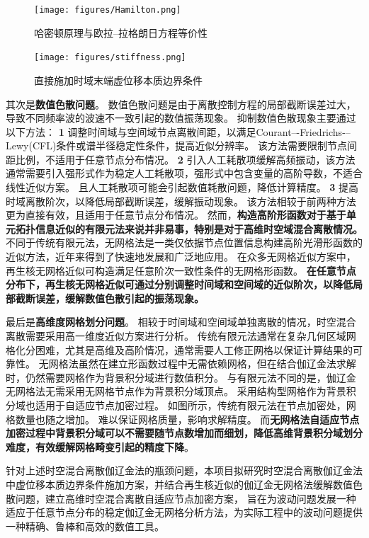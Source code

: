 \begin{figure}[!h]
    \centering 
    \texttt{[image: figures/Hamilton.png]}
    \caption{哈密顿原理与欧拉--拉格朗日方程等价性}
    \label{fg:hamilton}
\end{figure}

\begin{figure}[!h]
    \centering 
    \texttt{[image: figures/stiffness.png]}
    \caption{直接施加时域末端虚位移本质边界条件}
    \label{fg:direct}
\end{figure}

其次是\textbf{数值色散问题}。
数值色散问题是由于离散控制方程的局部截断误差过大，导致不同频率波的波速不一致引起的数值振荡现象。
抑制数值色散现象主要通过以下方法：
\textcircled{\textbf{\small 1}}
调整时间域与空间域节点离散间距，以满足Courant–-Friedrichs-–Lewy(CFL)条件或谱半径稳定性条件，提高近似分辨率。
该方法需要限制节点间距比例，不适用于任意节点分布情况。
\textcircled{\textbf{\small 2}}
引入人工耗散项缓解高频振动，该方法通常需要引入强形式作为稳定人工耗散项，强形式中包含变量的高阶导数，不适合线性近似方案。
且人工耗散项可能会引起数值耗散问题，降低计算精度。
\textcircled{\textbf{\small 3}}
提高时域离散阶次，以降低局部截断误差，缓解振动现象。
该方法相较于前两种方法更为直接有效，且适用于任意节点分布情况。
然而，\textbf{构造高阶形函数对于基于单元拓扑信息近似的有限元法来说并非易事，特别是对于高维时空域混合离散情况。}
不同于传统有限元法，无网格法\cite{Zhang2004a}是一类仅依据节点位置信息构建高阶光滑形函数的近似方法，近年来得到了快速地发展和广泛地应用。
在众多无网格近似方案中，再生核无网格近似可构造满足任意阶次一致性条件的无网格形函数。
\textbf{在任意节点分布下，再生核无网格近似可通过分别调整时间域和空间域的近似阶次，以降低局部截断误差，缓解数值色散引起的振荡现象。}

最后是\textbf{高维度网格划分问题}。
相较于时间域和空间域单独离散的情况，时空混合离散需要采用高一维度近似方案进行分析。
传统有限元法通常在复杂几何区域网格化分困难，尤其是高维及高阶情况，通常需要人工修正网格以保证计算结果的可靠性。
无网格法虽然在建立形函数过程中无需依赖网格，但在结合伽辽金法求解时，仍然需要网格作为背景积分域进行数值积分。
与有限元法不同的是，伽辽金无网格法无需采用无网格节点作为背景积分域顶点。
采用结构型网格作为背景积分域也适用于自适应节点加密过程。
如图所示，传统有限元法在节点加密处，网格数量也随之增加。
难以保证网格质量，影响求解精度。
而\textbf{无网格法自适应节点加密过程中背景积分域可以不需要随节点数增加而细划，降低高维背景积分域划分难度，有效缓解网格畸变引起的精度下降}。

针对上述时空混合离散伽辽金法的瓶颈问题，本项目拟研究时空混合离散伽辽金法中虚位移本质边界条件施加方案，并结合再生核近似的伽辽金无网格法缓解数值色散问题，建立高维时空混合离散自适应节点加密方案，
旨在为波动问题发展一种适应于任意节点分布的稳定伽辽金无网格分析方法，为实际工程中的波动问题提供一种精确、鲁棒和高效的数值工具。

